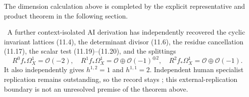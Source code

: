 The dimension calculation above is completed by the explicit representative
and product theorem in the following section.



\begin{auditrecord}
\label{record:h12-direct-images}
\Open\ A further context-isolated AI derivation has independently recovered
the cyclic invariant lattices (11.4), the determinant divisor (11.6), the
residue cancellation (11.17), the scalar test (11.19)--(11.20), and the
splittings
\[
 R^0f_*\Omega_X^1=\mathcal O(-2),\quad
 R^1f_*\Omega_X^1=\mathcal O\oplus\mathcal O(-1)^{\oplus2},\quad
 R^2f_*\Omega_X^1=\mathcal O\oplus\mathcal O(-1).
\]
It also independently gives $h^{1,2}=1$ and $h^{1,1}=2$.  Independent human
specialist replication remains outstanding, so the record stays \Open; this
external-replication boundary is not an unresolved premise of the theorem
above.
\end{auditrecord}
